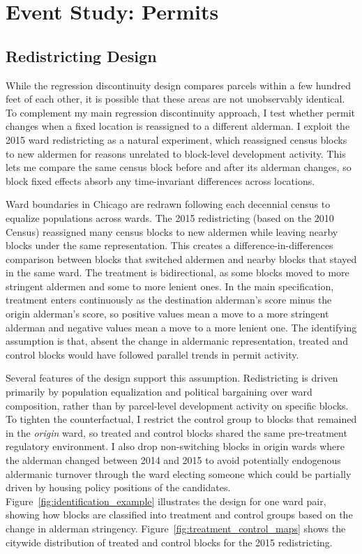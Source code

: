 \section{Event Study: Permits}
\label{sec:empirical_results_permits}

\subsection{Redistricting Design}

While the regression discontinuity design compares parcels within a few hundred feet of each other, it is possible that these areas are not unobservably identical. 
To complement my main regression discontinuity approach, I test whether permit changes when a fixed location is reassigned to a different alderman.
I exploit the 2015 ward redistricting as a natural experiment, which reassigned census blocks to new aldermen for reasons unrelated to block-level development activity.
This lets me compare the same census block before and after its alderman changes, so block fixed effects absorb any time-invariant differences across locations.

Ward boundaries in Chicago are redrawn following each decennial census to equalize populations across wards.
The 2015 redistricting (based on the 2010 Census) reassigned many census blocks to new aldermen while leaving nearby blocks under the same representation.
This creates a difference-in-differences comparison between blocks that switched aldermen and nearby blocks that stayed in the same ward.
The treatment is bidirectional, as some blocks moved to more stringent aldermen and some to more lenient ones.
In the main specification, treatment enters continuously as the destination alderman's score minus the origin alderman's score, so positive values mean a move to a more stringent alderman and negative values mean a move to a more lenient one.
The identifying assumption is that, absent the change in aldermanic representation, treated and control blocks would have followed parallel trends in permit activity.

Several features of the design support this assumption.
Redistricting is driven primarily by population equalization and political bargaining over ward composition, rather than by parcel-level development activity on specific blocks.
To tighten the counterfactual, I restrict the control group to blocks that remained in the \textit{origin} ward, so treated and control blocks shared the same pre-treatment regulatory environment.
I also drop non-switching blocks in origin wards where the alderman changed between 2014 and 2015 to avoid potentially endogenous aldermanic turnover through the ward electing someone which could be partially driven by housing policy positions of the candidates.
Figure~\ref{fig:identification_example} illustrates the design for one ward pair, showing how blocks are classified into treatment and control groups based on the change in alderman stringency.
Figure~\ref{fig:treatment_control_maps} shows the citywide distribution of treated and control blocks for the 2015 redistricting.


